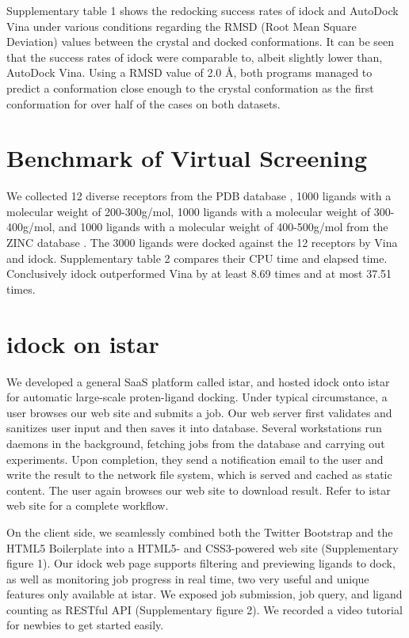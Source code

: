 \documentclass{bioinfo}
\begin{document}
Supplementary table 1 shows the redocking success rates of idock and AutoDock Vina under various conditions regarding the RMSD (Root Mean Square Deviation) values between the crystal and docked conformations. It can be seen that the success rates of idock were comparable to, albeit slightly lower than, AutoDock Vina. Using a RMSD value of 2.0 \AA, both programs managed to predict a conformation close enough to the crystal conformation as the first conformation for over half of the cases on both datasets.

\section{Benchmark of Virtual Screening}

We collected 12 diverse receptors from the PDB database \citep{540}, 1000 ligands with a molecular weight of 200-300g/mol, 1000 ligands with a molecular weight of 300-400g/mol, and 1000 ligands with a molecular weight of 400-500g/mol from the ZINC database \citep{1178}. The 3000 ligands were docked against the 12 receptors by Vina and idock. Supplementary table 2 compares their CPU time and elapsed time. Conclusively idock outperformed Vina by at least 8.69 times and at most 37.51 times.

\section{idock on istar}

We developed a general SaaS platform called istar, and hosted idock onto istar for automatic large-scale proten-ligand docking. Under typical circumstance, a user browses our web site and submits a job. Our web server first validates and sanitizes user input and then saves it into database. Several workstations run daemons in the background, fetching jobs from the database and carrying out experiments. Upon completion, they send a notification email to the user and write the result to the network file system, which is served and cached as static content. The user again browses our web site to download result. Refer to istar web site for a complete workflow.

On the client side, we seamlessly combined both the Twitter Bootstrap and the HTML5 Boilerplate into a HTML5- and CSS3-powered web site (Supplementary figure 1). Our idock web page supports filtering and previewing ligands to dock, as well as monitoring job progress in real time, two very useful and unique features only available at istar. We exposed job submission, job query, and ligand counting as RESTful API (Supplementary figure 2). We recorded a video tutorial for newbies to get started easily.
\end{document}
